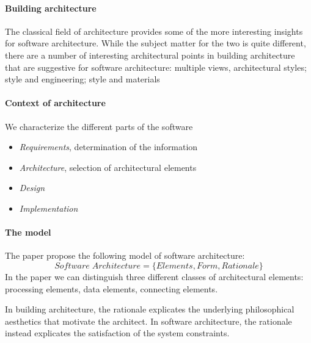 \paragraph{Building architecture}
The classical field of architecture provides some of the
more interesting insights for software architecture. While the subject matter for the two is quite different, there are a number of interesting architectural points in building architecture that are suggestive for software architecture: multiple views, architectural styles; style and engineering; style and materials

\paragraph{Context of architecture}
We characterize the different parts of the software
\begin{itemize}
    \item \textit{Requirements}, determination of the information
    \item \textit{Architecture}, selection of architectural elements
    \item \textit{Design}
    \item \textit{Implementation}
\end{itemize}

\paragraph{The model} 
The paper propose the following model of software architecture:
$$\mathit{Software\;Architecture = \{Elements, Form, Rationale\}}$$
In the paper we can distinguish three different classes of architectural elements: processing elements, data elements, connecting elements.

In building architecture, the rationale explicates the underlying philosophical aesthetics that motivate the architect. In software architecture, the rationale instead explicates the satisfaction of the system constraints.

\newpage
